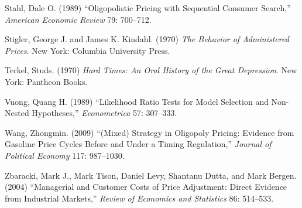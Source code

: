 \documentclass[11pt]{article}
\begin{document}
\begin{description}
\item Stahl, Dale O. (1989) ``Oligopolistic Pricing with Sequential
  Consumer Search,'' {\it American Economic Review} 79: 700--712.

\item Stigler, George J. and James K. Kindahl. (1970) {\it The
  Behavior of Administered Prices}. New York: Columbia University
  Press.

\item Terkel, Studs. (1970) {\it Hard Times: An Oral History of the
  Great Depression}. New York: Pantheon Books.

\item Vuong, Quang H. (1989) ``Likelihood Ratio Tests for Model
  Selection and Non-Nested Hypotheses,'' {\em Econometrica} 57:
  307--333.

\item Wang, Zhongmin. (2009) ``(Mixed) Strategy in Oligopoly Pricing:
  Evidence from Gasoline Price Cycles Before and Under a Timing
  Regulation,'' {\it Journal of Political Economy} 117: 987--1030.

\item Zbaracki, Mark J., Mark Tison, Daniel Levy, Shantanu Dutta, and
  Mark Bergen. (2004) ``Managerial and Customer Costs of Price
  Adjustment: Direct Evidence from Industrial Markets,'' {\it Review
    of Economics and Statistics} 86: 514--533.

\end{description}

\clearpage
\end{document}
